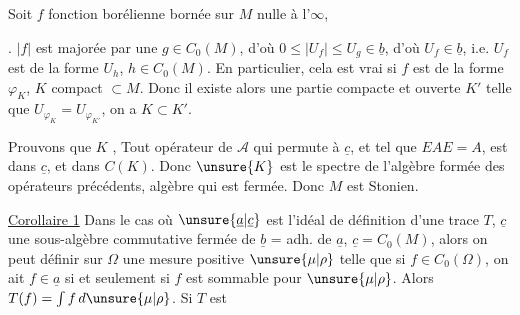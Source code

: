 Soit $f$ fonction borélienne bornée sur $M$ nulle à l'$\infty$,  

. $|f|$ est majorée par une $g\in C_0(M)$, d'où $0\leq|U_f|\leq U_g\in\underline b$, d'où $U_f\in\underline b$, i.e. $U_f$ est de la forme $U_h$, $h\in C_0(M)$. En particulier, cela est vrai si $f$ est de la  forme $\varphi_K$, $K$ compact $\subset M$. Donc il existe alors une partie compacte et ouverte $K'$ telle que $U_{\varphi_K}=U_{\varphi_{K'}}$, on a $K\subset K'$.

Prouvons que $K$ ,  Tout opérateur  de $\mathcal A$ qui permute à $\underline c$, et tel que $EAE=A$, est dans $\underline c$, et  dans $C(K)$. Donc $\unsure{K}$ est le spectre de l'algèbre formée des opérateurs précédents, algèbre qui est   fermée. Donc $M$ est Stonien.

\uline{Corollaire 1} Dans le cas où $\unsure{\underline a|\underline c}$ est l'idéal de définition d'une trace  $T$, $\underline c$ une sous-algèbre commutative  fermée de $\underline b$ = adh. de $\underline a$, $\underline c=C_0(M)$, alors on peut définir sur $\Omega$ une mesure positive $\unsure{\mu|\rho}$ telle que si $f\in C_0(\Omega)$, on ait $f\in\underline a$ si et seulement si $f$ est sommable pour $\unsure{\mu|\rho}$. Alors $T(f)=\int f\,d\unsure{\mu|\rho}$. Si $T$ est 
